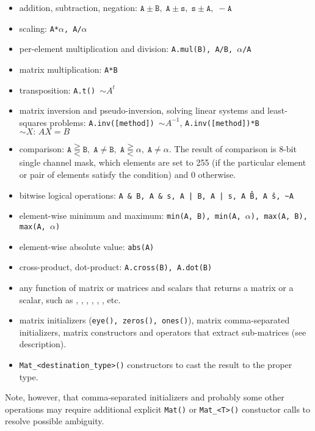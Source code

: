 \begin{itemize}
    \item addition, subtraction, negation: $\texttt{A}\pm \texttt{B},\;\texttt{A}\pm \texttt{s},\;\texttt{s}\pm \texttt{A},\;-\texttt{A}$
    \item scaling: \texttt{A*$\alpha$, A/$\alpha$}
    \item per-element multiplication and division: \texttt{A.mul(B), A/B, $\alpha$/A}
    \item matrix multiplication: \texttt{A*B}
    \item transposition: \texttt{A.t() $\sim A^t$}
    \item matrix inversion and pseudo-inversion, solving linear systems and least-squares problems:
        \texttt{A.inv([method]) $\sim A^{-1}$}, \texttt{A.inv([method])*B $\sim X:\,AX=B$}
    \item comparison: $\texttt{A}\gtreqqless \texttt{B},\;\texttt{A} \ne \texttt{B},\;\texttt{A}\gtreqqless \alpha,\; \texttt{A} \ne \alpha$.
          The result of comparison is 8-bit single channel mask, which elements are set to 255
          (if the particular element or pair of elements satisfy the condition) and 0 otherwise.
    \item bitwise logical operations: \texttt{A \& B, A \& s, A | B, A | s, A \^ B, A \^ s, \textasciitilde A}
    \item element-wise minimum and maximum: \texttt{min(A, B), min(A, $\alpha$), max(A, B), max(A, $\alpha$)}
    \item element-wise absolute value: \texttt{abs(A)}
    \item cross-product, dot-product: \texttt{A.cross(B), A.dot(B)}
    \item any function of matrix or matrices and scalars that returns a matrix or a scalar, such as
          , , , , ,
          ,  etc.
    \item matrix initializers (\texttt{eye(), zeros(), ones()}), matrix comma-separated initializers,
          matrix constructors and operators that extract sub-matrices (see  description).
    \item \verb"Mat_<destination_type>()" constructors to cast the result to the proper type.
\end{itemize}
Note, however, that comma-separated initializers and probably some other operations may require additional explicit \texttt{Mat()} or \verb"Mat_<T>()" constuctor calls to resolve possible ambiguity.

